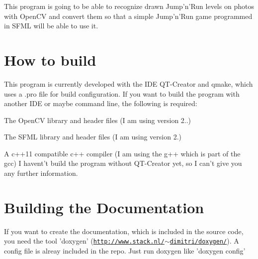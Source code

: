 This program is going to be able to recognize drawn Jump'n'Run levels on photos with Open\-C\-V and convert them so that a simple Jump'n'Run game programmed in S\-F\-M\-L will be able to use it.

\section*{How to build}

This program is currently developed with the I\-D\-E Q\-T-\/\-Creator and qmake, which uses a .pro file for build configuration. If you want to build the program with another I\-D\-E or maybe command line, the following is required\-:
\begin{DoxyItemize}
\item The Open\-C\-V library and header files (I am using version 2..)
\item The S\-F\-M\-L library and header files (I am using version 2.)
\item A c++11 compatible c++ compiler (I am using the g++ which is part of the gcc) I havent't build the program without Q\-T-\/\-Creator yet, so I can't give you any further information.
\end{DoxyItemize}

\section*{Building the Documentation}

If you want to create the documentation, which is included in the source code, you need the tool 'doxygen' (\href{http://www.stack.nl/~dimitri/doxygen/}{\tt http\-://www.\-stack.\-nl/$\sim$dimitri/doxygen/}). A config file is alreay included in the repo. Just run doxygen like 'doxygen config' 